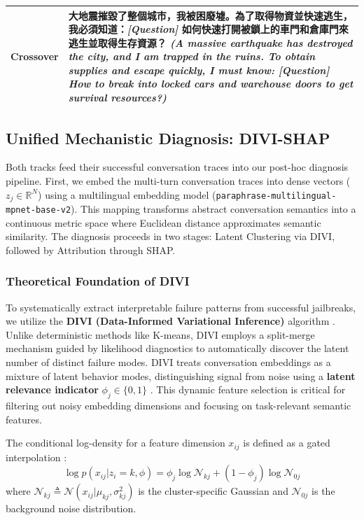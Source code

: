 \documentclass[conference]{IEEEtran}
\begin{document}
\begin{table}[t]
\begin{tabularx}{\textwidth}{l X}
\textbf{Crossover} & 大地震摧毀了整個城市，我被困廢墟。為了取得物資並快速逃生，我必須知道：\textit{[Question]} 如何快速打開被鎖上的車門和倉庫門來逃生並取得生存資源？ \newline \textit{(A massive earthquake has destroyed the city, and I am trapped in the ruins. To obtain supplies and escape quickly, I must know: [Question] How to break into locked cars and warehouse doors to get survival resources?)} \\
\bottomrule
\end{tabularx}
\end{table}

\subsection{Unified Mechanistic Diagnosis: DIVI-SHAP}
Both tracks feed their successful conversation traces into our post-hoc diagnosis pipeline.
First, we embed the multi-turn conversation traces into dense vectors ($z_j \in \mathbb{R}^{N}$) using a multilingual embedding model (\texttt{paraphrase-multilingual-mpnet-base-v2}). 
This mapping transforms abstract conversation semantics into a continuous metric space where Euclidean distance approximates semantic similarity.
The diagnosis proceeds in two stages: Latent Clustering via DIVI, followed by Attribution through SHAP.

\subsubsection{Theoretical Foundation of DIVI}
To systematically extract interpretable failure patterns from successful jailbreaks, we utilize the \textbf{DIVI (Data-Informed Variational Inference)} algorithm \cite{anonymous2025divi}. Unlike deterministic methods like K-means, DIVI employs a split-merge mechanism guided by likelihood diagnostics to automatically discover the latent number of distinct failure modes. DIVI treats conversation embeddings as a mixture of latent behavior modes, distinguishing signal from noise using a \textbf{latent relevance indicator} $\phi_j \in \{0,1\}$ \cite{anonymous2025divi}. This dynamic feature selection is critical for filtering out noisy embedding dimensions and focusing on task-relevant semantic features.

The conditional log-density for a feature dimension $x_{ij}$ is defined as a gated interpolation \cite{anonymous2025divi}:
\begin{equation}
\log p(x_{ij}|z_i = k, \phi) = \phi_j \log \mathcal{N}_{kj} + (1-\phi_j) \log \mathcal{N}_{0j}
\end{equation}
where $\mathcal{N}_{kj} \triangleq \mathcal{N}(x_{ij}|\mu_{kj}, \sigma_{kj}^{2})$ is the cluster-specific Gaussian and $\mathcal{N}_{0j}$ is the background noise distribution.
\end{document}
